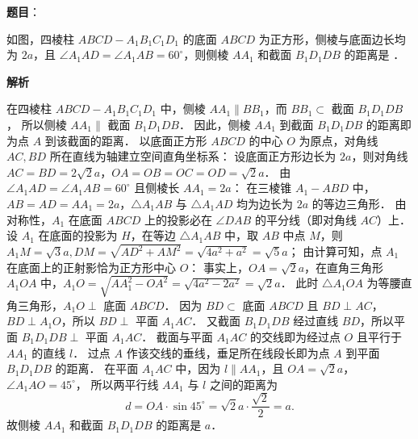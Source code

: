 \begin{answer}

\textbf{题目}：

如图，四棱柱 $ABCD - A_1B_1C_1D_1$ 的底面 $ABCD$ 为正方形，侧棱与底面边长均为 $2a$，且 $\angle A_1AD = \angle A_1AB = 60^\circ$，则侧棱 $AA_1$ 和截面 $B_1D_1DB$ 的距离是 \underline{\hspace{3cm}}．
\nopagebreak[4]
\begin{center}\end{center}
\nopagebreak[4]
\textbf{解析}
\nopagebreak[4]
\begin{center}\end{center}
\nopagebreak[4]
在四棱柱 $ABCD - A_1B_1C_1D_1$ 中，侧棱 $AA_1 \parallel BB_1$，而 $BB_1 \subset$ 截面 $B_1D_1DB$，
所以侧棱 $AA_1 \parallel$ 截面 $B_1D_1DB$．
因此，侧棱 $AA_1$ 到截面 $B_1D_1DB$ 的距离即为点 $A$ 到该截面的距离．
以底面正方形 $ABCD$ 的中心 $O$ 为原点，对角线 $AC, BD$ 所在直线为轴建立空间直角坐标系：
设底面正方形边长为 $2a$，则对角线 $AC = BD = 2\sqrt{2}a$，$OA = OB = OC = OD = \sqrt{2}a$．
由 $\angle A_1AD = \angle A_1AB = 60^\circ$ 且侧棱长 $AA_1 = 2a$：
在三棱锥 $A_1 - ABD$ 中，$AB = AD = AA_1 = 2a$，$\triangle A_1AB$ 与 $\triangle A_1AD$ 均为边长为 $2a$ 的等边三角形．
由对称性，$A_1$ 在底面 $ABCD$ 上的投影必在 $\angle DAB$ 的平分线（即对角线 $AC$）上．
设 $A_1$ 在底面的投影为 $H$，在等边 $\triangle A_1AB$ 中，取 $AB$ 中点 $M$，则 $A_1M = \sqrt{3}a, DM = \sqrt{AD^2 + AM^2} = \sqrt{4a^2 + a^2} = \sqrt{5}a$；
由计算可知，点 $A_1$ 在底面上的正射影恰为正方形中心 $O$：
事实上，$OA = \sqrt{2}a$，在直角三角形 $A_1OA$ 中，$A_1O = \sqrt{AA_1^2 - OA^2} = \sqrt{4a^2 - 2a^2} = \sqrt{2}a$．
此时 $\triangle A_1OA$ 为等腰直角三角形，$A_1O \perp$ 底面 $ABCD$．
因为 $BD \subset$ 底面 $ABCD$ 且 $BD \perp AC$，$BD \perp A_1O$，所以 $BD \perp$ 平面 $A_1AC$．
又截面 $B_1D_1DB$ 经过直线 $BD$，所以平面 $B_1D_1DB \perp$ 平面 $A_1AC$．
截面与平面 $A_1AC$ 的交线即为经过点 $O$ 且平行于 $AA_1$ 的直线 $l$．
过点 $A$ 作该交线的垂线，垂足所在线段长即为点 $A$ 到平面 $B_1D_1DB$ 的距离．
在平面 $A_1AC$ 中，因为 $l \parallel AA_1$，且 $OA = \sqrt{2}a$，$\angle A_1AO = 45^\circ$，
所以两平行线 $AA_1$ 与 $l$ 之间的距离为
\nopagebreak[4]
\[
d = OA \cdot \sin 45^\circ = \sqrt{2}a \cdot \frac{\sqrt{2}}{2} = a.
\]
故侧棱 $AA_1$ 和截面 $B_1D_1DB$ 的距离是 $a$．


\end{answer}
